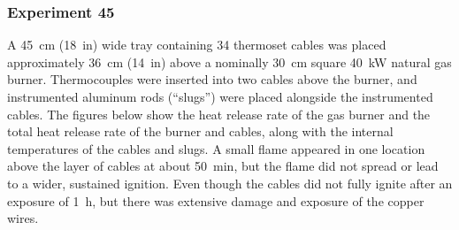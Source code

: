 \subsubsection{Experiment 45}

A 45~cm (18~in) wide tray containing 34 thermoset cables was placed approximately 36~cm (14~in) above a nominally 30~cm square 40~kW natural gas burner. Thermocouples were inserted into two cables above the burner, and instrumented aluminum rods (``slugs'') were placed alongside the instrumented cables. The figures below show the heat release rate of the gas burner and the total heat release rate of the burner and cables, along with the internal temperatures of the cables and slugs. A small flame appeared in one location above the layer of cables at about 50~min, but the flame did not spread or lead to a wider, sustained ignition. Even though the cables did not fully ignite after an exposure of 1~h, but there was extensive damage and exposure of the copper wires.

